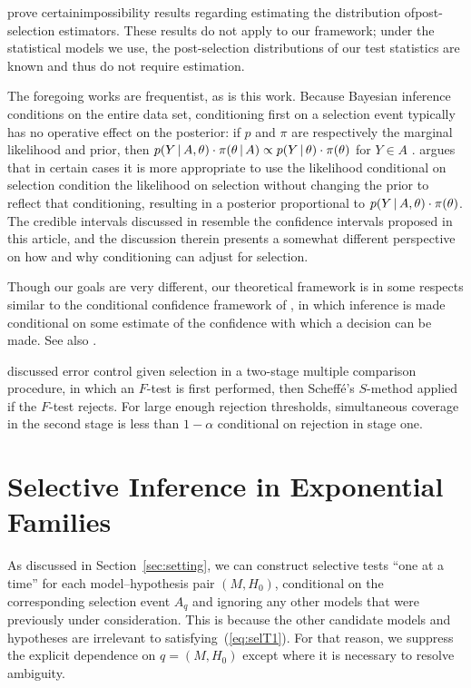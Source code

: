 \documentclass{article}
\theoremstyle{definition}
\begin{document}
\citet{leeb2005model,leeb2006can,leeb2008can} prove certainimpossibility results regarding estimating the distribution ofpost-selection estimators. These results do not apply to our framework; under the statistical models we use, the post-selection distributions of our test statistics are known and thus do not require estimation.


The foregoing works are frequentist, as is this work. Because Bayesian inference conditions on the entire data set, conditioning first on a selection event typically has no operative effect on the posterior: if $p$ and $\pi$ are respectively the marginal likelihood and prior, then $p(Y \,|\, A, \theta)\cdot \pi(\theta \,|\, A) \propto p(Y \,|\, \theta)\cdot \pi(\theta)$ for $Y\in A$  \citep{dawid1994selection}. \citet{yekutieli2012adjusted} argues that in certain cases it is more appropriate to use the likelihood conditional on selection condition the likelihood on selection without changing the prior to reflect that conditioning, resulting in a posterior proportional to $p(Y \,|\, A, \theta)\cdot \pi(\theta)$. The credible intervals discussed in \citet{yekutieli2012adjusted} resemble the confidence intervals proposed in this article, and the discussion therein presents a somewhat different perspective on how and why conditioning can adjust for selection.



Though our goals are very different, our theoretical framework is in some respects similar to the conditional confidence framework of \citet{kiefer1976admissibility}, in which inference is made conditional on some estimate of the confidence with which a decision can be made. See also \citet{kiefer1977conditional, brownie1977ideas,brown1978contribution,berger1994unified}.

\citet{olshen1973conditional} discussed error control given selection in a two-stage multiple comparison procedure, in which an $F$-test is first performed, then Scheff\'{e}'s $S$-method applied if the $F$-test rejects. For large enough rejection thresholds, simultaneous coverage in the second stage is less than $1-\alpha$ conditional on rejection in stage one.



\section{Selective Inference in Exponential Families}\label{sec:exfam}

As discussed in Section~\ref{sec:setting}, we can construct selective tests ``one at a time'' for each model--hypothesis pair $(M, H_0)$, conditional on the corresponding selection event $A_q$ and ignoring any other models that were previously under consideration. This is because the other candidate models and hypotheses are irrelevant to satisfying~(\ref{eq:selT1}). For that reason, we suppress the explicit dependence on $q=(M,H_0)$ except where it is necessary to resolve ambiguity.
\end{document}
